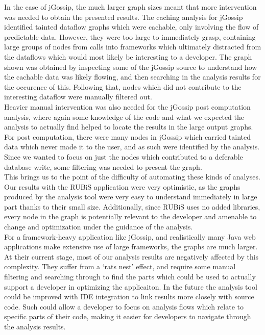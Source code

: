 \documentclass[msc,oneside]{ubcthesis}
\begin{document}
In the case of jGossip, the much larger graph sizes meant that more intervention was needed to obtain the presented results. The caching analysis for jGossip identified tainted dataflow graphs which were cachable, only involving the flow of predictable data. However, they were too large to immediately grasp, containing large groups of nodes from calls into frameworks which ultimately distracted from the dataflows which would most likely be interesting to a developer. The graph shown was obtained by inspecting some of the jGossip source to understand how the cachable data was likely flowing, and then searching in the analysis results for the occurence of this. Following that, nodes which did not contribute to the interesting dataflow were manually filtered out.\\

Heavier manual intervention was also needed for the jGossip post computation analysis, where again some knowledge of the code and what we expected the analysis to actually find helped to locate the results in the large output graphs. For post computation, there were many nodes in jGossip which carried tainted data which never made it to the user, and as such were identified by the analysis. Since we wanted to focus on just the nodes which contributed to a deferable database write, some filtering was needed to present the graph.\\

This brings us to the point of the difficulty of automating these kinds of analyses. Our results with the RUBiS application were very optimistic, as the graphs produced by the analysis tool were very easy to understand immediately in large part thanks to their small size. Additionally, since RUBiS uses no added libraries, every node in the graph is potentially relevant to the developer and amenable to change and optimization under the guidance of the analysis.\\

For a framework-heavy application like jGossip, and realistically many Java web applications make extensive use of large frameworks, the graphs are much larger. At their current stage, most of our analysis results are negatively affected by this complexity. They suffer from a `rats nest' effect, and require some manual filtering and searching through to find the parts which could be used to actually support a developer in optimizing the applicaiton. In the future the analysis tool could be improved with IDE integration to link results more closely with source code. Such could allow a developer to focus on analysis flows which relate to specific parts of their code, making it easier for developers to navigate through the analysis results.\\
\end{document}
